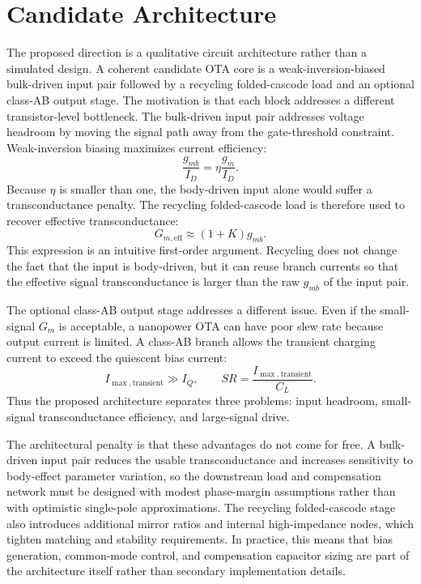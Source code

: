 \documentclass[conference,a4paper]{IEEEtran}
\begin{document}
\section{Candidate Architecture}
The proposed direction is a qualitative circuit architecture rather than a simulated design. A coherent candidate OTA core is a weak-inversion-biased bulk-driven input pair followed by a recycling folded-cascode load and an optional class-AB output stage. The motivation is that each block addresses a different transistor-level bottleneck. The bulk-driven input pair addresses voltage headroom by moving the signal path away from the gate-threshold constraint. Weak-inversion biasing maximizes current efficiency:
\begin{equation}
  \frac{g_{mb}}{I_D}=\eta\frac{g_m}{I_D}.
\end{equation}
Because $\eta$ is smaller than one, the body-driven input alone would suffer a transconductance penalty. The recycling folded-cascode load is therefore used to recover effective transconductance:
\begin{equation}
  G_{m,\mathrm{eff}}\approx(1+K)g_{mb}.
\end{equation}
This expression is an intuitive first-order argument. Recycling does not change the fact that the input is body-driven, but it can reuse branch currents so that the effective signal transconductance is larger than the raw $g_{mb}$ of the input pair.

The optional class-AB output stage addresses a different issue. Even if the small-signal $G_m$ is acceptable, a nanopower OTA can have poor slew rate because output current is limited. A class-AB branch allows the transient charging current to exceed the quiescent bias current:
\begin{equation}
  I_{\max,\mathrm{transient}}\gg I_Q,
  \qquad
  SR=\frac{I_{\max,\mathrm{transient}}}{C_L}.
\end{equation}
Thus the proposed architecture separates three problems: input headroom, small-signal transconductance efficiency, and large-signal drive.

The architectural penalty is that these advantages do not come for free. A bulk-driven input pair reduces the usable transconductance and increases sensitivity to body-effect parameter variation, so the downstream load and compensation network must be designed with modest phase-margin assumptions rather than with optimistic single-pole approximations. The recycling folded-cascode stage also introduces additional mirror ratios and internal high-impedance nodes, which tighten matching and stability requirements. In practice, this means that bias generation, common-mode control, and compensation capacitor sizing are part of the architecture itself rather than secondary implementation details.
\end{document}
